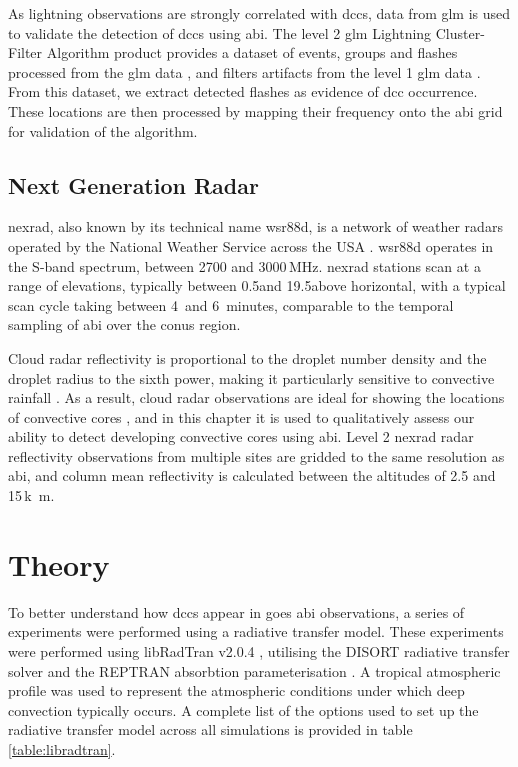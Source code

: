 As lightning observations are strongly correlated with \acrshort{dcc}s, data from \acrshort{glm} is used to validate the detection of \acrshort{dcc}s using \acrshort{abi}.
The level 2 \acrshort{glm} Lightning Cluster-Filter Algorithm product provides a dataset of events, groups and flashes processed from the \acrshort{glm} data \citep{peterson_research_2019}, and filters artifacts from the level 1 \acrshort{glm} data \citep{peterson_removing_2020}.
From this dataset, we extract detected flashes as evidence of \acrshort{dcc} occurrence.
These locations are then processed by mapping their frequency onto the \acrshort{abi} grid for validation of the algorithm.

\subsection{Next Generation Radar}

\acrshort{nexrad}, also known by its technical name \acrfull{wsr88d}, is a network of weather radars operated by the National Weather Service across the USA \citep{crum_wsr-88d_1993}.
\acrshort{wsr88d} operates in the S-band spectrum, between 2700 and 3000\,\unit{MHz}.
\acrshort{nexrad} stations scan at a range of elevations, typically between 0.5\textdegree and 19.5\textdegree above horizontal, with a typical scan cycle taking between 4\, and 6~minutes, comparable to the temporal sampling of \acrshort{abi} over the \acrshort{conus} region.

Cloud radar reflectivity is proportional to the droplet number density and the droplet radius to the sixth power, making it particularly sensitive to convective rainfall \citep{yau_short_1989}.
As a result, cloud radar observations are ideal for showing the locations of convective cores \citep{austin_relation_1987, rosenfeld_general_1993, zipser_vertical_1994}, and in this chapter it is used to qualitatively assess our ability to detect developing convective cores using \acrshort{abi}.
Level 2 \acrshort{nexrad} radar reflectivity observations from multiple sites are gridded to the same resolution as \acrshort{abi}, and column mean reflectivity is calculated between the altitudes of 2.5 and 15\,\unit{k m}.

\section{Theory} \label{sec:detection_theory}

To better understand how \acrshort{dcc}s appear in \acrshort{goes} \acrshort{abi} observations, a series of experiments were performed using a radiative transfer model.
These experiments were performed using libRadTran v2.0.4 \citep{emde_libradtran_2016}, utilising the DISORT radiative transfer solver \citep{buras_new_2011} and the REPTRAN absorbtion parameterisation \citep{gasteiger_representative_2014}.
A tropical atmospheric profile was used to represent the atmospheric conditions under which deep convection typically occurs.
A complete list of the options used to set up the radiative transfer model across all simulations is provided in table \ref{table:libradtran}.

